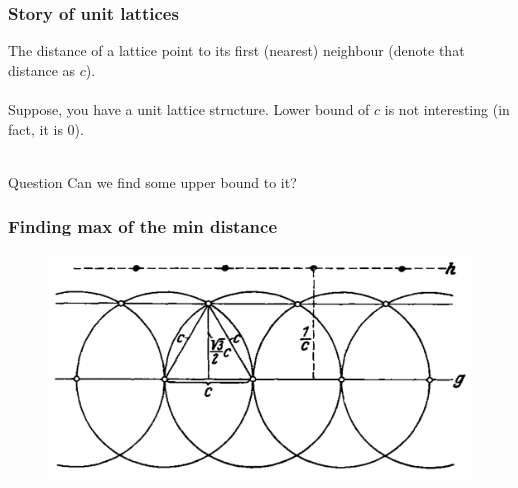 \documentclass{beamer}
\begin{document}
    \begin{frame}
        \frametitle{Story of unit lattices}
        The distance of a lattice point to its first (nearest) neighbour (denote that distance as \(c\)). \pause \\~\\

        Suppose, you have a unit lattice structure.
        Lower bound of \(c\) is not interesting (in fact, it is 0). \pause \\~\\

        \begin{alertblock}{Question}
            Can we find some upper bound to it?
        \end{alertblock}
        
    \end{frame}

    \begin{frame}
        \frametitle{Finding max of the min distance}
        \begin{figure}
            \includegraphics[scale=0.45]{dist.png}
        \end{figure}
    \end{frame}
\end{document}
